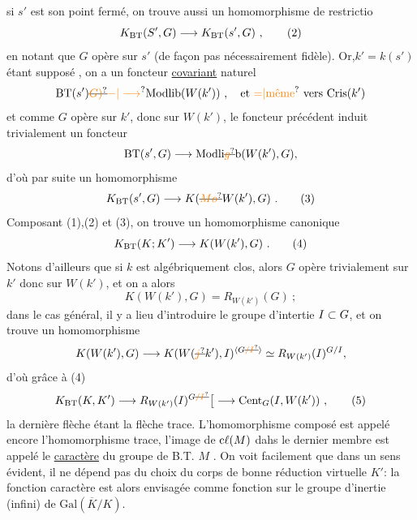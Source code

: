 si $s'$ est son point fermé, on trouve aussi un homomorphisme de restrictio
\[
K_{\mathrm{BT}}(S',G)\handwritten{\longrightarrow}K_{\mathrm{BT}}(s',G)\ ,\tag*{\handwritten{(2)}}
\]
en notant que $G$ opère sur $s'$ (de façon pas nécessairement fidèle). Or,$k'=k(s')$ étant supposé , on a un foncteur \uline{covariant} naturel
\[
\mathrm{BT}(s')\deleted{\unsure{G)}}\handwritten{\unsure{\mathord{-}|\longrightarrow}}\mathrm{Modlib}(W(k'))\ ,\quad
\handwritten{\text{et \unsure{$=$|même} vers }\mathrm{Cris}(k')}
\]
et comme $G$ opère sur $k'$, donc sur $W(k')$, le foncteur précédent induit trivialement un foncteur
\[
\mathrm{BT}(s',G)\handwritten{\longrightarrow}\mathrm{Modli}\deleted{\unsure{g}}\mathrm b(W(k'),G),
\]
d'où par suite un homomorphisme
\[
K_{\mathrm{BT}}(s',G)\handwritten{\longrightarrow}K(\deleted{\unsure{Mo}}W(k'),G)\ .\tag*{\handwritten{(3)}}
\]
Composant (1),(2) et (3), on trouve un homomorphisme canonique
\[
K_{\mathrm{BT}}(K;K')\handwritten{\longrightarrow}K(W(k'),G)\ .\tag*{\handwritten{(4)}}
\]
Notons d'ailleurs que si $k$ est algébriquement clos, alors $G$ opère trivialement sur $k'$ donc sur $W(k')$, et on a alors
\[
K(W(k'),G)=R_{W(k')}(G)\ ;
\]
dans le cas général, il y a lieu d'introduire le groupe d'intertie $I\subset G$, et on trouve un homomorphisme
\[
K(W(k'),G)\handwritten{\longrightarrow}K(W(\deleted{\unsure{j}}k'),I)^{\inserted{\handwritten{G\deleted{\unsure{/I}}}}}\handwritten{\simeq}R_{W(k')}(I)^{\handwritten{G/I}},
\]
d'où grâce à (4)
\[
K_{\mathrm{BT}}(K,K')\handwritten{\longrightarrow}R_{W(k')}(I)^{\handwritten{G\deleted{\unsure{/I}}}}
\handwritten{\big[}\handwritten{\longrightarrow}\mathrm{Cent}_{\handwritten{G}}(I,W(\handwritten{k}'))\ ,\tag*{\handwritten{(5)}}
\]
la dernière flèche étant la flèche trace. L'homomorphisme composé est appelé encore l'homomorphisme trace, l'image de $\mathrm{c}\ell(M)$ dahs le dernier membre est appelé le \uline{caractère} du groupe de B.T. $M$ . On voit facilement que dans un sens évident, il ne dépend pas du choix du corps de bonne réduction virtuelle $K'$: la fonction caractère est alors envisagée comme fonction sur le groupe d'inertie (infini) de $\mathrm{Gal}(\overline K/K)$.

